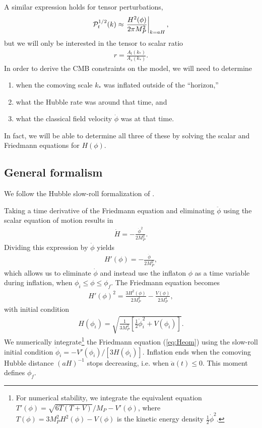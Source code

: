 \documentclass[aps,amsfonts,amsmath,prd,preprint,nofootinbib,superscriptaddress]{revtex4}
\newcommand{\Mp}{{M_{P}}}
\newcommand{\MMp}{{M_P^2}}
\begin{document}
\begin{appendix}
A similar expression holds for tensor perturbations, 
\begin{align}
{\cal P}_{t}^{1/2}(k) \approx \left.\frac{H^2(\phi)}{2\pi\MMp}\right|_{k = a H},
\end{align}
but we will only be interested in the tensor to scalar ratio
\begin{align}
r = \frac{A_t(k_\ast)}{A_s(k_\ast)}.
\end{align}
In order to derive the CMB constraints on the model, we will need to determine 
\begin{enumerate}
\item when the comoving scale $k_\ast$ was inflated outside of the ``horizon,''
\item what the Hubble rate was around that time, and
\item what the classical field velocity $\dot \phi$ was at that time.
\end{enumerate}
In fact, we will be able to determine all three of these by solving the scalar and Friedmann equations for $H(\phi)$.


\subsection{General formalism}


We follow the Hubble slow-roll formalization of \cite{Liddle:1994dx}.  


Taking a time derivative of the Friedmann equation 
and eliminating $\ddot \phi$ using the scalar equation of motion results in
\begin{align}
\dot H = -\frac{\dot \phi^2}{2\MMp}.
\end{align}
Dividing this expression by $\dot\phi$ yields
\begin{align}\label{eq:phidot}
H'(\phi) = -\frac{\dot \phi}{2\MMp},
\end{align}
which allows us to eliminate $\dot \phi$ and instead use
the inflaton $\phi$ as a time variable during inflation, when $\phi_i \leq \phi \leq \phi_f$.  The Friedmann equation becomes
\begin{align}\label{eq:Heom}
H'(\phi)^2 = \frac{3 H^2(\phi)}{2\MMp} - \frac{V(\phi)}{2 M^4_P},
\end{align}
with initial condition
\begin{align}
H(\phi_i) = \sqrt{\frac{1}{3\MMp}\left[\tfrac{1}{2}\dot \phi_i^2 + V(\phi_i)  \right]}.
\end{align}
We numerically integrate\footnote{For numerical stability, we integrate the equivalent equation $T'(\phi) = \sqrt{6T\left(T+V\right)}/\Mp - V'(\phi)$, where $T(\phi) = 3\MMp H^2(\phi) - V(\phi)$ is the kinetic energy density $\frac{1}{2}\dot\phi^2$.}
the Friedmann equation (\ref{eq:Heom}) using the slow-roll initial condition ${\dot \phi_i = -V'(\phi_i)/[3H(\phi_i)]}$.  Inflation ends when the 
comoving Hubble distance $\left(a H\right)^{-1}$ stops decreasing, i.e. when ${\ddot a(t) \leq 0}$.  This moment defines $\phi_f$. 


\end{appendix}
\end{document}
